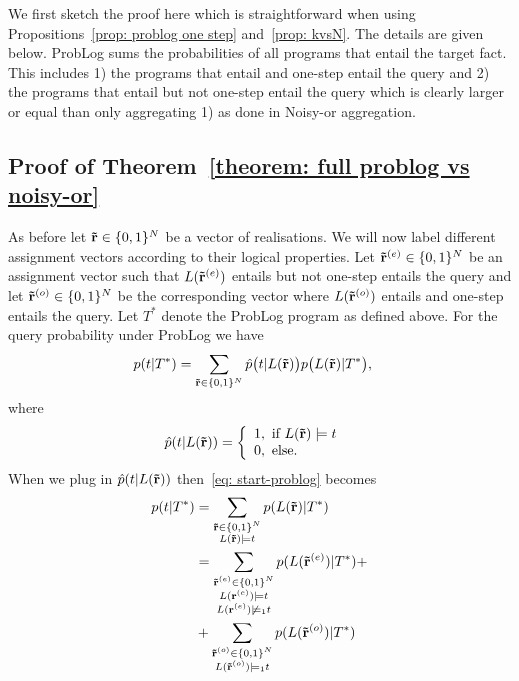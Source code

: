 \documentclass{article}
\theoremstyle{plain}
\theoremstyle{remark}
\newcommand{\vecallrules}{\mathbf{\Tilde{r}}}
\begin{document}
{\noindent We first sketch the proof here which is straightforward when using Propositions~\ref{prop: problog one step} and~\ref{prop: kvsN}. The details are given below. ProbLog sums the probabilities of all programs that entail the target fact. This includes 1) the  programs that entail and one-step entail the query and 2) the programs that entail but not one-step entail the query which is clearly larger or equal than only aggregating 1) as done in Noisy-or aggregation.

\subsection*{Proof of Theorem~\ref{theorem: full problog vs noisy-or}}
As before let $\vecallrules \in \{0,1\}^N$ be a vector of realisations. We will now label different assignment vectors according to their logical properties. Let $\vecallrules^{(e)} \in \{0, 1\}^N$ be an assignment vector such that $L(\vecallrules^{(e)})$ entails but not one-step entails the query and let $\vecallrules^{(o)} \in \{0, 1\}^N$ be the corresponding vector where $L(\vecallrules^{(o)})$ entails and one-step entails the query. Let $T^*$ denote the ProbLog program as defined above. For the query probability under ProbLog we have
\begin{align}
    p(t | T^*) &= \sum_{\vecallrules \in \{0,1\}^N} \hat{p}\big(t | L(\vecallrules)\big)p\big(L(\vecallrules)|T^*\big) \label{eq: start-problog},
\end{align}
where
\begin{align*}
     \hat{p}(t | L(\vecallrules))= \left\{ \begin{array}{l}
    1, \textrm{ if $L(\vecallrules) \models t$   } \ \\
    0, \textrm{ else}.
  \end{array}\right.
\end{align*}
When we plug in $\hat{p}(t | L(\vecallrules))$  then~\eqref{eq: start-problog} becomes
\begin{align*}
   p(t | T^*)&=\sum\limits_{\substack{\vecallrules \in \{0,1\}^N \\ L(\vecallrules) \models t}} p(L(\vecallrules)|T^*) \\
     &= \sum\limits_{\substack{\vecallrules^{(e)} \in \{0,1\}^N \\ L(\mathbf{r}^{(e)}) \models t \\  L(\mathbf{r}^{(e)}) \not\models_1 t}} p(L(\vecallrules^{(e)})|T^*)+\\ &+\sum\limits_{\substack{\vecallrules^{(o)} \in \{0,1\}^N  \\  L(\vecallrules^{(o)}) \models_1 t } } p(L(\vecallrules^{(o)})|T^*)\\

\end{align*}}
\end{document}
